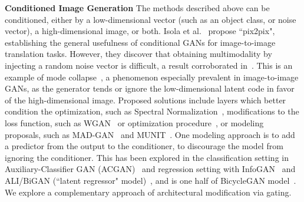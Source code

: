 \vspace{2mm} \noindent \textbf{Conditioned Image Generation} The methods described above can be conditioned, either by a low-dimensional vector (such as an object class, or noise vector), a high-dimensional image, or both. Isola et al.~\cite{isola2016image2image} propose ``pix2pix", establishing the general usefulness of conditional GANs for image-to-image translation tasks. However, they discover that obtaining multimodality by injecting a random noise vector is difficult, a result corroborated in~\cite{mathieu2015deep,pathak2016context,zhu2017toward}.
This is an example of mode collapse~\cite{goodfellow2016nips}, a phenomenon especially prevalent in image-to-image GANs, as the generator tends or ignore the low-dimensional latent code in favor of the high-dimensional image.
Proposed solutions include layers which better condition the optimization, such as Spectral Normalization~\cite{zhang2018self,miyato2018spectral}, modifications to the loss function, such as WGAN~\cite{arjovsky2017wasserstein,gulrajani2017improved} or optimization procedure~\cite{heusel2017gans}, or modeling proposals, such as MAD-GAN~\cite{ghosh2017multi} and MUNIT~\cite{huang2018multimodal}. 
One modeling approach is to add a predictor from the output to the conditioner, to discourage the model from ignoring the conditioner. This has been explored in the classification setting in Auxiliary-Classifier GAN (ACGAN)~\cite{odena2016conditional} and regression setting with InfoGAN~\cite{chen2016infogan} and ALI/BiGAN (``latent regressor" model)~\cite{dumoulin2016adversarially,donahue2016adversarial}, and is one half of BicycleGAN model~\cite{zhu2017toward}. We explore a complementary approach of architectural modification via gating.

